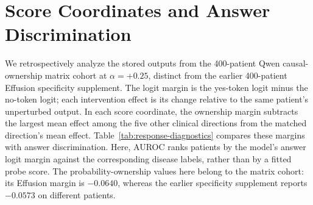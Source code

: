 \section{Score Coordinates and Answer Discrimination}
\label{app:response-diagnostics}

We retrospectively analyze the stored outputs from the 400-patient Qwen
causal-ownership matrix cohort at $\alpha=+0.25$, distinct from the earlier
400-patient Effusion specificity supplement. The logit margin is the yes-token
logit minus the no-token logit; each intervention effect is its change
relative to the same patient's unperturbed output. In each score coordinate,
the ownership margin subtracts the largest mean effect among the five other
clinical directions from the matched direction's mean effect.
Table~\ref{tab:response-diagnostics} compares these margins with answer
discrimination. Here, AUROC ranks patients by the model's answer logit
margin against the corresponding disease labels, rather than by a fitted
probe score. The probability-ownership values here belong to the matrix
cohort: its Effusion margin is $-0.0640$, whereas the earlier specificity
supplement reports $-0.0573$ on different patients.

\begin{table}[H]
\centering
\caption{Score-coordinate ownership and answer discrimination.}
\label{tab:response-diagnostics}
\end{table}


